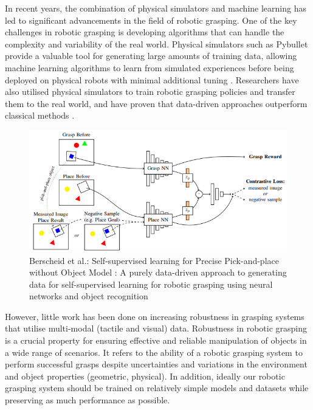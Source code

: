\documentclass[11pt, a4paper]{report}
\begin{document}
In recent years, the combination of physical simulators and machine learning has led to significant advancements in the field of robotic grasping. One of the key challenges in robotic grasping is developing algorithms that can handle the complexity and variability of the real world. Physical simulators such as Pybullet \cite{coumans2021} provide a valuable tool for generating large amounts of training data, allowing machine learning algorithms to learn from simulated experiences before being deployed on physical robots with minimal additional tuning \cite{berscheid2020selfsupervised}. Researchers have also utilised physical simulators to train robotic grasping policies \cite{Chebotar_2017} and transfer them to the real world, and have proven that data-driven approaches outperform classical methods \cite{zhang2022robotic}.
\begin{figure}[ht]
    \centering
    \includegraphics[width=\textwidth]{docs/Project Report/Media/1_1_berscheid_2020_sl_for_precise_pickandplace_wo_obj_model_network.png}
    \caption{Berscheid et al.: Self-supervised learning for Precise Pick-and-place without Object Model \cite{berscheid2020selfsupervised}: A purely data-driven approach to generating data for self-supervised learning for robotic grasping using neural networks and object recognition}
    \label{fig:1.1}
\end{figure}

However, little work has been done on increasing robustness in grasping systems that utilise multi-modal (tactile and visual) data. Robustness in robotic grasping is a crucial property for ensuring effective and reliable manipulation of objects in a wide range of scenarios. It refers to the ability of a robotic grasping system to perform successful grasps despite uncertainties and variations in the environment and object properties (geometric, physical). In addition, ideally our robotic grasping system should be trained on relatively simple models and datasets while preserving as much performance as possible.\\
\end{document}
